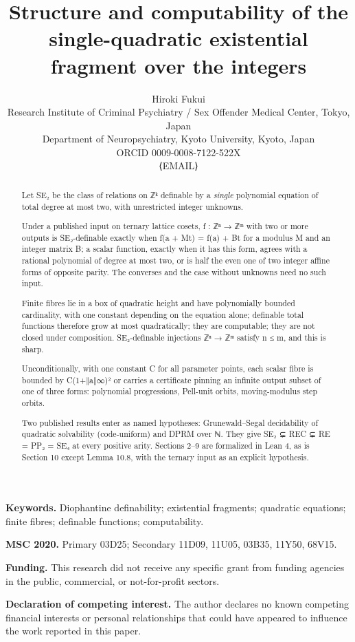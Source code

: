 \title{Structure and computability of the single-quadratic existential fragment over the integers}
\author{Hiroki Fukui\\ \small Research Institute of Criminal Psychiatry / Sex Offender Medical Center, Tokyo, Japan\\ \small Department of Neuropsychiatry, Kyoto University, Kyoto, Japan\\ \small ORCID 0009-0008-7122-522X\\ \small ⟨EMAIL⟩}
\date{}
\maketitle
\linenumbers
\begin{abstract}
Let SE₂ be the class of relations on ℤᵏ definable by a \emph{single} polynomial equation of total degree at most two, with unrestricted integer unknowns.

Under a published input on ternary lattice cosets, f : ℤⁿ → ℤᵐ with two or more outputs is SE₂-definable exactly when f(a + Mt) = f(a) + Bt for a modulus M and an integer matrix B; a scalar function, exactly when it has this form, agrees with a rational polynomial of degree at most two, or is half the even one of two integer affine forms of opposite parity. The converses and the case without unknowns need no such input.

Finite fibres lie in a box of quadratic height and have polynomially bounded cardinality, with one constant depending on the equation alone; definable total functions therefore grow at most quadratically; they are computable; they are not closed under composition. SE₂-definable injections ℤⁿ → ℤᵐ satisfy n ≤ m, and this is sharp.

Unconditionally, with one constant C for all parameter points, each scalar fibre is bounded by C(1+‖a‖∞)² or carries a certificate pinning an infinite output subset of one of three forms: polynomial progressions, Pell-unit orbits, moving-modulus step orbits.

Two published results enter as named hypotheses: Grunewald–Segal decidability of quadratic solvability (code-uniform) and DPRM over ℕ. They give SE₂ ⊊ REC ⊊ RE = PP₂ = SE₄ at every positive arity. Sections 2–9 are formalized in Lean 4, as is Section 10 except Lemma 10.8, with the ternary input as an explicit hypothesis.

\end{abstract}
\noindent\textbf{Keywords.} Diophantine definability; existential fragments; quadratic equations; finite fibres; definable functions; computability.

\noindent\textbf{MSC 2020.} Primary 03D25; Secondary 11D09, 11U05, 03B35, 11Y50, 68V15.

\noindent\textbf{Funding.} This research did not receive any specific grant from funding agencies in the public, commercial, or not-for-profit sectors.

\noindent\textbf{Declaration of competing interest.} The author declares no known competing financial interests or personal relationships that could have appeared to influence the work reported in this paper.

